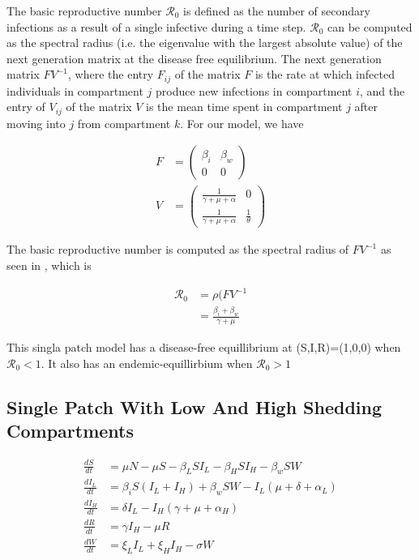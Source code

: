 \documentclass[12pt]{article}\usepackage[]{graphicx}\usepackage[]{color}
\begin{document}
The basic reproductive number ${\mathcal R_0}$ is defined as the number of secondary infections as a result of a single infective during a time step.
${\mathcal R_0}$ can be computed as the spectral radius (i.e. the eigenvalue with the largest absolute value) of the next generation matrix at the disease free equilibrium.
The next generation matrix $FV^{−1}$, where the entry $F_{ij}$ of the matrix $F$ is the rate at which infected individuals in compartment $j$ produce new infections in compartment $i$, and the entry of $V_{ij}$ of the matrix $V$ is the mean time spent in compartment $j$ after moving into $j$ from compartment $k$.
For our model, we have
\begin{linenomath}
\begin{align*}
		F&=\begin{pmatrix}
			\beta_i & \beta_w\\
			0 & 0
			\end{pmatrix}\\
		V&=\begin{pmatrix}
			\frac{1}{\gamma+\mu+\alpha} & 0\\
			\frac{1}{\gamma+\mu+\alpha} &\frac{1}{\theta}
			\end{pmatrix}
\end{align*}
\end{linenomath}
The basic reproductive number is computed as the spectral radius of $FV^{-1}$ as seen in \cite{link9}, which is
\begin{linenomath}
\begin{align*}
    {\mathcal R_0} &= \rho(FV^{-1}\\
		           &=\frac{\beta_i+\beta_w}{\gamma+\mu}
\end{align*}
\end{linenomath}
This singla patch model has a disease-free equillibrium at (S,I,R)=(1,0,0) when ${\mathcal R_0}<1$.
It also has an endemic-equillirbium when ${\mathcal R_0}>1$

\subsection{Single Patch With Low And High Shedding Compartments}

\begin{linenomath}
\begin{align*}
	\frac{dS}{dt}&= \mu N - \mu S - \beta_L S I_L - \beta_H S I_H - \beta_w S W  \\
	\frac{dI_L}{dt}&= \beta_i S( I_L + I_H) + \beta_w S W - I_L (\mu + \delta + \alpha_L) \\
	\frac{dI_H}{dt}&= \delta I_L - I_H (\gamma + \mu + \alpha_H) \\
	\frac{dR}{dt}&= \gamma I_H - \mu R \\
	\frac{dW}{dt}&= \xi_L I_L + \xi_H I_H  - \sigma W\\
	\end{align*}
\end{linenomath}
\end{document}
